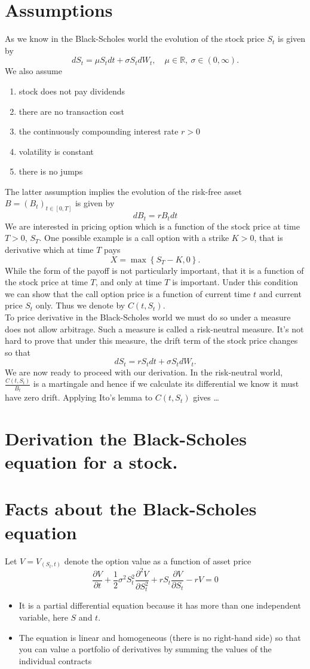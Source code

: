 \documentclass{book}
\begin{document}
\section{Assumptions}
As we know in the Black-Scholes world the evolution of the stock price $S_{t}$ is given by 
$$
dS_{t}=\mu S_{t}dt+\sigma S_{t}dW_{t},\quad\mu\in\mathbb{R},\ \sigma\in(0,\infty).
$$
We also assume
\begin{enumerate}
\item stock does not pay dividends
\item there are no transaction cost
\item the continuously compounding interest rate $r>0$
\item volatility is constant
\item there is no jumps
\end{enumerate}
The latter assumption implies the evolution of the risk-free asset $B=(B_{t})_{t\in[0,T]}$ is given by 
$$
dB_{t}=rB_{t}dt
$$
We are interested in pricing option which is a function of the stock price at time $T>0$, $S_{T}$. One possible example is a call option with a strike $K>0$, that is derivative which at time $T$ pays 
$$
X=\max\left\{S_{T}-K,0\right\}.
$$
While the form of the payoff is not particularly important, that it is a function of the stock price at time $T$, and only at time $T$ is important. Under this condition we can show that the call option price is a function of current time $t$ and current price $S_{t}$ only. Thus we denote by $C(t,S_{t})$.\\
To price derivative in the Black-Scholes world we must do so under a measure does not allow arbitrage. Such a measure is called a risk-neutral measure. It's not hard to prove that under this measure, the drift term of the stock price changes so that 
$$
dS_{t}=r S_{t}dt+\sigma S_{t}dW_{t}.
$$
We are now ready to proceed with our derivation. In the risk-neutral world, $\frac{C(t,S_{t})}{B_{t}}$ is a martingale and hence if we calculate its differential we know it must have zero drift. Applying Ito's lemma to $C(t,S_{t})$ gives \dots
\section{Derivation the Black-Scholes equation for a stock.}
\section{Facts about the Black-Scholes equation}
Let $V=V_(S_{t},t)$ denote the option value as a function of asset price
$$
\frac{\partial V}{\partial t}+\frac{1}{2}\sigma ^{2}S_{t}^{2}\frac{\partial^{2} V}{\partial S_{t}^{2}}+rS_{t}\frac{\partial V}{\partial S_{t}}-rV=0
$$
\begin{itemize}
\item It is a partial differential equation because it has more than one independent variable, here $S$ and $t$.
\item The equation is linear and homogeneous (there is no right-hand side) so that you can value a portfolio of derivatives by summing the values of the individual contracts

\end{itemize}
\end{document}
